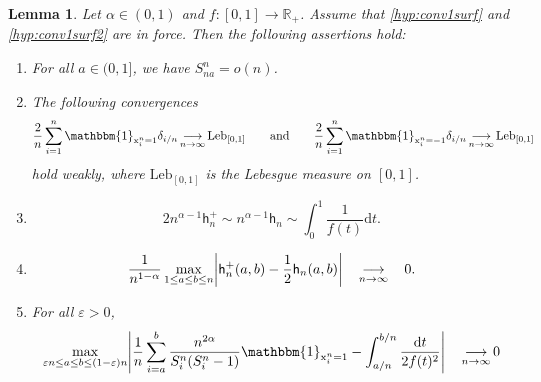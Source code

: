 \documentclass[11pt]{article}
\theoremstyle{plain}
\newtheorem{lemma}[theorem]{Lemma}
\theoremstyle{definition}
\theoremstyle{remark}
\newcommand{\R}{\mathbb{R}} %
\newcommand{\1}{\mathbbm{1}} %
\newcommand{\e}{\varepsilon} %
\newcommand{\h}{\mathsf{h}} %
\newcommand{\X}{\mathrm x} %
\let\originalleft\left
\let\originalright\right
\renewcommand{\left}{\mathopen{}\mathclose\bgroup\originalleft}
\renewcommand{\right}{\aftergroup\egroup\originalright}
\begin{document}
\begin{lemma}
\label{lem:hnalpha}
Let $\alpha \in (0,1)$ and $f:[0,1] \rightarrow \R_+$. Assume that \ref{hyp:conv1surf} and \ref{hyp:conv1surf2} are in force. Then the following assertions hold:
\begin{enumerate}
\item[(i)] For all $a \in (0,1]$, we have $S^n_{n a} = o(n)$.
\item[(ii)]  
The following convergences
\[
\frac{2}{n} \sum_{i=1}^n \1_{\X_i^n=1} \delta_{i/n} \mathop{\longrightarrow}\limits_{n\to  \infty}
\mathrm{Leb}_{[0,1]} \qquad \text{and} \qquad \frac{2}{n} \sum_{i=1}^n \1_{\X_i^n=-1} \delta_{i/n} \mathop{\longrightarrow}\limits_{n\to  \infty}
\mathrm{Leb}_{[0,1]} 
\]
hold weakly, where $\mathrm{Leb}_{[0,1]}$ is the Lebesgue measure on $[0,1]$.
\item[(iii)]  
\[
2n^{\alpha-1}\h_n^+ \sim n^{\alpha-1}\h_n \sim  \int_{0}^{1} \frac{1}{f(t)}\mathrm{d}t.
\]
\item[(iv)]
\[
\frac{1}{n^{1-\alpha}} \max_{1 \leq a \leq b \leq n} \left| \h^{+}_n(a,b)- \frac{1}{2} \h_n(a,b) \right|  \quad \mathop{\longrightarrow}_{n \rightarrow \infty} \quad 0.
\]
\item[(v)]
For all $\e>0$,
\[
\max_{\e n \le a \le b \le (1-\e)n}
\left\vert
\frac{1}{n} \sum_{i=a}^b \frac{n^{2\alpha}}{S^n_i(S^n_i-1)} \1_{\X^n_i=1}
-\int_{a/n}^{b/n} \frac{\mathrm{d}t}{2 f(t)^2}
\right\vert
\quad
\mathop{\longrightarrow}\limits_{n\to \infty}
0
\]
\end{enumerate}
\end{lemma}
\end{document}
